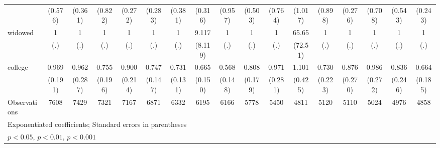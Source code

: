 {\begin{tabular}{l*{16}{c}}
                    &     (0.576)         &     (0.361)         &     (0.822)         &     (0.272)         &     (0.283)         &     (0.381)         &     (0.316)         &     (0.957)         &     (0.503)         &     (0.764)         &     (1.017)         &     (0.898)         &     (0.276)         &     (0.708)         &     (0.543)         &     (0.243)         \\
[1em]
widowed             &           1         &           1         &           1         &           1         &           1         &           1         &       9.117\sym{*}  &           1         &           1         &           1         &       65.65\sym{***}&           1         &           1         &           1         &           1         &           1         \\
                    &         (.)         &         (.)         &         (.)         &         (.)         &         (.)         &         (.)         &     (8.119)         &         (.)         &         (.)         &         (.)         &     (72.51)         &         (.)         &         (.)         &         (.)         &         (.)         &         (.)         \\
[1em]
college             &       0.969         &       0.962         &       0.755         &       0.900         &       0.747         &       0.731         &       0.665         &       0.568\sym{*}  &       0.808         &       0.971         &       1.101         &       0.730         &       0.876         &       0.986         &       0.836         &       0.664         \\
                    &     (0.191)         &     (0.287)         &     (0.196)         &     (0.214)         &     (0.147)         &     (0.131)         &     (0.150)         &     (0.148)         &     (0.179)         &     (0.281)         &     (0.425)         &     (0.223)         &     (0.270)         &     (0.272)         &     (0.246)         &     (0.185)         \\
\hline
Observations        &        7608         &        7429         &        7321         &        7167         &        6871         &        6332         &        6195         &        6166         &        5778         &        5450         &        4811         &        5120         &        5110         &        5024         &        4976         &        4858         \\
\hline\hline
\multicolumn{17}{l}{\footnotesize Exponentiated coefficients; Standard errors in parentheses}\\
\multicolumn{17}{l}{\footnotesize \sym{*} \(p<0.05\), \sym{**} \(p<0.01\), \sym{***} \(p<0.001\)}\\
\end{tabular}
}
